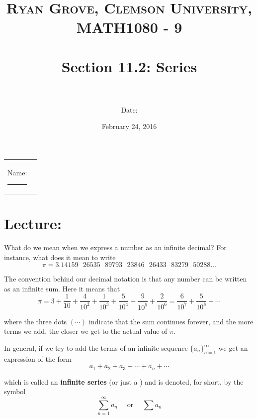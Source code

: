 \documentclass[paper=a4, fontsize=11pt]{scrartcl} %
\title{	
\normalfont \normalsize 
\textsc{Ryan Grove, Clemson University, MATH1080 - 9} \\ [25pt] %
\horrule{0.5pt} \\[0.4cm] %
\huge Section 11.2: Series \\ %
\horrule{2pt} \\[0.5cm] %
}
\author{Date:} %
\date{\normalsize February 24, 2016} %
\numberwithin{equation}{section} %
\numberwithin{figure}{section} %
\numberwithin{table}{section} %
\newcommand{\ds}{\displaystyle}
\begin{document}
\maketitle %

\begin{flushleft}
\begin{tabular}{l l}
Name: \rule{3.2in}{.01cm}  & {}%
\end{tabular}
\end{flushleft}


\section*{\textbf{Lecture:}}
What do we mean when we express a number as an infinite decimal? For instance, what does it mean to write
\[\pi = 3.14159\text{ }26535\text{ }89793\text{ }23846\text{ }26433\text{ }83279\text{ }50288\ldots\]

The convention behind our decimal notation is that any number can be written as an infinite sum. Here it means that
\[\pi = 3 + \ds\frac{1}{10} + \ds\frac{4}{10^2} + \ds\frac{1}{10^3} + \ds\frac{5}{10^4} + \ds\frac{9}{10^5} + \ds\frac{2}{10^6} = \ds\frac{6}{10^7} + \ds\frac{5}{10^8} + \cdots\]

where the three dots $(\cdots)$ indicate that the sum continues forever, and the more terms we add, the closer we get to the actual value of $\pi$.\\
\indent

In general, if we try to add the terms of an infinite sequence $\{a_n\}_{n=1}^\infty$ we get an expression of the form
\[a_1 + a_2 + a_3 + \cdots + a_n + \cdots\]

which is called an \textbf{infinite series} (or just a \underline{\hspace{1in}}) and is denoted, for short, by the symbol
\[\ds\sum_{n=1}^\infty a_n \quad \text{ or } \quad \ds\sum a_n\]
\indent
\end{document}
